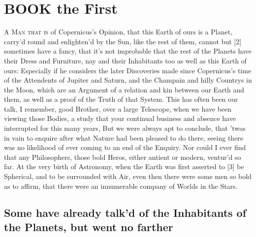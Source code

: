 \documentclass[letterpaper]{book}
\begin{document}
\tableofcontents
\mainmatter

\chapter{BOOK the First}
\lettrine[lines=6, lraise=.26]{ A}{ Man that is} of Copernicus's Opinion, that this Earth of ours is a Planet,
carry'd round and enlighten'd by the Sun, like the rest of them, cannot but
[2] sometimes have a fancy, that it's not improbable that the rest of the
Planets have their Dress and Furniture, nay and their Inhabitants too as
well as this Earth of ours: Especially if he considers the later Discoveries
made since Copernicus's time of the Attendents of Jupiter and Saturn, and
the Champain and hilly Countrys in the Moon, which are an Argument
of a relation and kin between our Earth and them, as well as a proof of
the Truth of that System. This has often been our talk, I remember, good
Brother, over a large Telescope, when we have been viewing those Bodies,
a study that your continual business and absence have interrupted for this
many years, But we were always apt to conclude, that 'twas in vain to
enquire after what Nature had been pleased to do there, seeing there was
no likelihood of ever coming to an end of the Enquiry. Nor could I ever find
that any Philosophers, those bold Heros, either antient or modern, ventur'd
so far. At the very birth of Astronomy, when the Earth was first asserted
to [3] be Spherical, and to be surrounded with Air, even then there were
some men so bold as to affirm, that there were an innumerable company of
Worlds in the Stars.


\section{Some have already talk'd of the Inhabitants of the
Planets, but went no farther}
\end{document}
